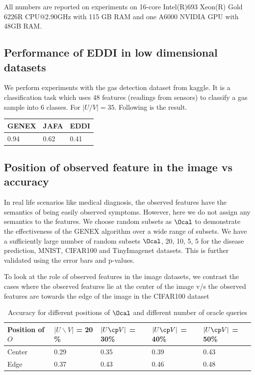 \documentclass[letterpaper]{article}
\begin{document}
All numbers are reported on experiments on 16-core Intel(R)693
Xeon(R) Gold 6226R CPU@2.90GHz with 115 GB RAM and one A6000 NVIDIA GPU with 48GB RAM.  

\subsection{Performance of EDDI in low dimensional datasets}

{We perform experiments with the gas detection dataset from kaggle. It is a classification task which uses 48 features (readings from sensors) to classify a gas sample into 6 classes.} For $|U/V|=35$. Following is the result.

\begin{table}[!ht]
    \centering
    \begin{tabular}{|l|l|l|}
    \hline
        GENEX & JAFA & EDDI \\ \hline
        0.94 & 0.62 & 0.41 \\ \hline
    \end{tabular}
\end{table}
 
\subsection{Position of observed feature in the image vs accuracy}

 In real life scenarios like medical diagnosis, the observed features have the semantics of being easily observed symptoms. However, here we do not assign any semantics to the features. We choose random subsets as $\Ocal$ to demonstrate the effectiveness of the GENEX algorithm over a wide range of subsets. We have a sufficiently large number of random subsets $\Ocal$, 20, 10, 5, 5 for the disease prediction, MNIST, CIFAR100 and TinyImagenet datasets. This is further validated using the error bars and p-values. 

To look at the role of observed features in the image datasets, we contrast the cases where the observed features lie at the center of the image v/s the observed features are towards the edge of the image in the CIFAR100 dataset

\begin{table}[!ht]
    \centering
    \begin{tabular}{|l|l|l|l|l|}
    \hline
        Position of $O$ &  $|U \backslash V|$ = 20 \% &$|U\cp V|$ = 30\% &$|U\cp V|$ = 40\% &$|U\cp V|$ = 50\% \\ \hline
        Center & 0.29 & 0.35 & 0.39 & 0.43 \\ \hline
        Edge & 0.37 & 0.43 & 0.46 & 0.48 \\ \hline
    \end{tabular}
    \caption{Accuracy for different positions of $\Ocal$ and different number of oracle queries}
\end{table}
\end{document}
